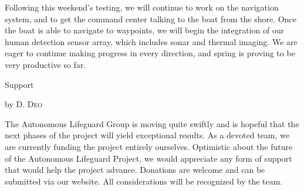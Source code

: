 \documentclass[10pt,a4paper]{article}
\newcommand{\NewsItem}[1]{%
		\usefont{T1}{augie}{m}{n} 	
		\large #1 \vspace{4pt}
		\par \normalsize \normalfont}
\newcommand{\NewsAuthor}[1]{%
			\hfill by \textsc{#1} \vspace{4pt}
			\par \normalfont}
\begin{document}
\begin{multicols}{3}
Following this weekend's testing, we will continue to work on the navigation system, and to get the command center talking to the boat from the shore. Once the boat is able to navigate to waypoints, we will begin the integration of our human detection sensor array, which includes sonar and thermal imaging. We are eager to continue making progress in every direction, and spring is proving to be very productive so far.

\vspace{1cm}
\NewsItem{Support}
\NewsAuthor{D. Deo}
The Autonomous Lifeguard Group is moving quite swiftly and is hopeful that the next phases of the project will yield exceptional results. As a devoted team, we are currently funding the project entirely ourselves. Optimistic about the future of the Autonomous Lifeguard Project, we would appreciate any form of support that would help the project advance. Donations are welcome and can be submitted via our website. All considerations will be recognized by the team.
\end{multicols}
\end{document}
